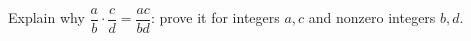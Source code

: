 Explain why $\dfrac ab\cdot\dfrac cd=\dfrac{ac}{bd}$: prove it for integers $a,c$ and nonzero integers $b,d$.
